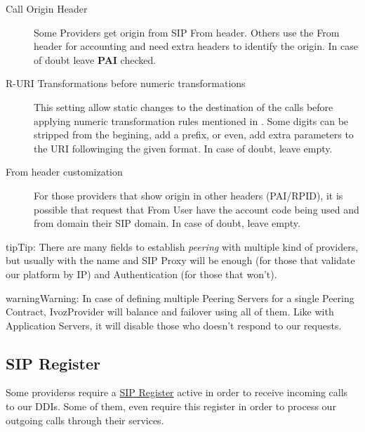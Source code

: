 \documentclass[letterpaper,10pt,english]{sphinxmanual}
\begin{document}
\begin{description}
\item[{Call Origin Header}] \leavevmode{}\label{external_incoming_calls/peering_contracts:term-call-origin-header}
Some Providers get origin from SIP From header. Others use the From
header for accounting and need extra headers to identify the origin.
In case of doubt leave \textbf{PAI} checked.

\item[{R-URI Transformations before numeric transformations}] \leavevmode{}\label{external_incoming_calls/peering_contracts:term-r-uri-transformations-before-numeric-transformations}
This setting allow static changes to the destination of the calls before
applying numeric transformation rules mentioned in
{\hyperref[external_incoming_calls/numeric_transformations:numeric\string-transformations]{}}. Some digits can be stripped from the
begining, add a prefix, or even, add extra parameters to the URI
followinging the given format. In case of doubt, leave empty.

\item[{From header customization}] \leavevmode{}\label{external_incoming_calls/peering_contracts:term-from-header-customization}
For those providers that show origin in other headers (PAI/RPID), it is
possible that request that From User have the account code being used
and from domain their SIP domain. In case of doubt, leave empty.

\end{description}

\begin{notice}{tip}{Tip:}
There are many fields to establish \emph{peering} with multiple kind of
providers, but usually with the name and SIP Proxy will be enough (for
those that validate our platform by IP) and Authentication (for those that
won't).
\end{notice}

\begin{notice}{warning}{Warning:}
In case of defining multiple Peering Servers for a single
Peering Contract, IvozProvider will balance and failover using all of them.
Like with Application Servers, it will disable those who doesn't respond to
our requests.
\end{notice}


\subsection{SIP Register}
\label{external_incoming_calls/peering_contracts:sip-register}
Some providerss require a \href{https://tools.ietf.org/html/rfc3261\#section-10}{SIP Register} active in order to receive
incoming calls to our DDIs. Some of them, even require this register in order
to process our outgoing calls through their services.
\end{document}
